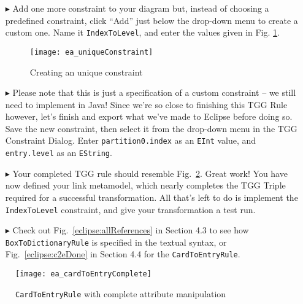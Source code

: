 \begin{enumerate}

\item[$\blacktriangleright$] Add one more constraint to your diagram but, instead of choosing a predefined constraint, click ``Add'' just below the
drop-down menu to create a custom one. Name it \texttt{IndexToLevel}, and enter the values given in Fig. \ref{ea:create_new_constraint}.

\vspace{0.5cm}

\begin{figure}[htbp]
\begin{center}
  \texttt{[image: ea\_uniqueConstraint]}
  \caption{Creating an unique constraint}
  \label{ea:create_new_constraint}
\end{center}
\end{figure}
\FloatBarrier

\item[$\blacktriangleright$] Please note that this is just a specification of a custom constraint -- we still need to implement in Java! Since we're so close to
finishing this TGG Rule however, let's finish and export what we've made to Eclipse before doing so. Save the new constraint, then select it from the drop-down
menu in the TGG Constraint Dialog. Enter \texttt{partition0.index} as an \texttt{EInt} value, and \texttt{entry.level} as an \texttt{EString}.

\vspace{0.5cm}

\item[$\blacktriangleright$] Your completed TGG rule should resemble Fig.~\ref{ea:cardtoentry_complete}. Great work! You have now defined your link metamodel,
which nearly completes the TGG Triple required for a successful transformation. All that's left to do is implement the \texttt{IndexToLevel} constraint, and
give your transformation a test run.

\vspace{0.5cm}

\item[$\blacktriangleright$] Check out Fig.~\ref{eclipse:allReferences} in Section 4.3 to see how \texttt{BoxToDictionaryRule} is specified in the textual
syntax, or Fig.~\ref{eclipse:c2eDone} in Section 4.4 for the \texttt{CardToEntryRule}.

\end{enumerate}

\newpage

\vspace*{3cm}

\begin{figure}[htbp]
\begin{center}
  \texttt{[image: ea\_cardToEntryComplete]}
  \caption{\texttt{CardToEntryRule} with complete attribute manipulation}
  \label{ea:cardtoentry_complete}
\end{center}
\end{figure}

